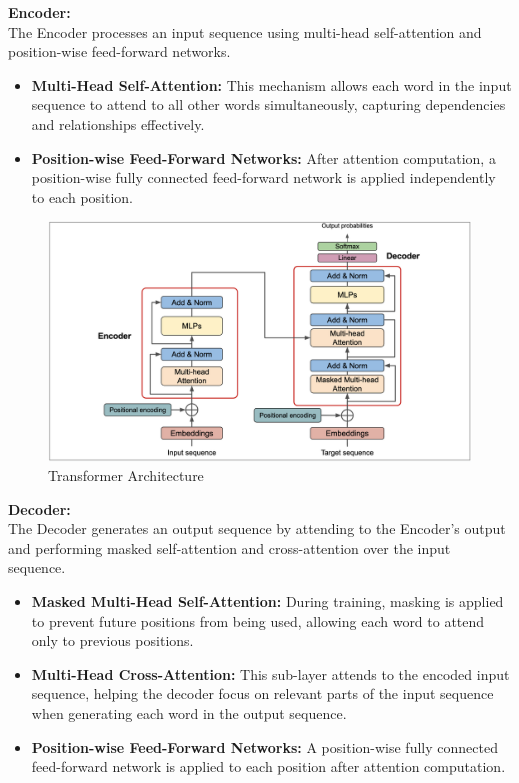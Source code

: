 \hfill \break
\textbf{Encoder:} \\
The Encoder processes an input sequence using multi-head self-attention and position-wise feed-forward networks.


\begin{itemize}
    \item \textbf{Multi-Head Self-Attention:} This mechanism allows each word in the input sequence to attend to all other words simultaneously, capturing dependencies and relationships effectively.
    
    \item \textbf{Position-wise Feed-Forward Networks:} After attention computation, a position-wise fully connected feed-forward network is applied independently to each position.
\end{itemize}

\begin{figure}[h!]
	\centering
	\includegraphics[scale=0.3]{figures/transformer.png}
	\caption{Transformer Architecture}
\end{figure}

\hfill \break
\textbf{Decoder:}  \\
The Decoder generates an output sequence by attending to the Encoder's output and performing masked self-attention and cross-attention over the input sequence.


\begin{itemize}
    \item \textbf{Masked Multi-Head Self-Attention:} During training, masking is applied to prevent future positions from being used, allowing each word to attend only to previous positions.
    
    \item \textbf{Multi-Head Cross-Attention:} This sub-layer attends to the encoded input sequence, helping the decoder focus on relevant parts of the input sequence when generating each word in the output sequence.
    
    \item \textbf{Position-wise Feed-Forward Networks:} A position-wise fully connected feed-forward network is applied to each position after attention computation.
\end{itemize}


